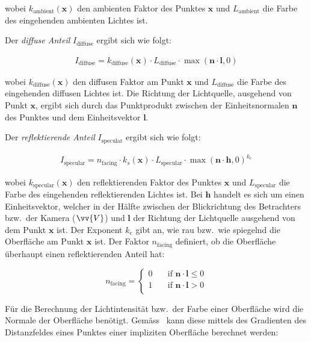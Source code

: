 wobei $k_{\text{ambient}}(\bm{x})$ den ambienten Faktor des
Punktes $\bm{x}$ und $L_{\text{ambient}}$ die Farbe des eingehenden ambienten
Lichtes ist.

Der \textit{diffuse Anteil} $I_{\text{diffuse}}$ ergibt sich wie folgt:

\begin{gather}
    I_{\text{diffuse}} = k_{\text{diffuse}}(\bm{x}) \cdot L_{\text{diffuse}} \cdot \max(\bm{n} \cdot \bm{l}, 0)
\end{gather}

wobei $k_{\text{diffuse}}(\bm{x})$ den diffusen Faktor am Punkt $\bm{x}$
und $L_{\text{diffuse}}$ die Farbe des eingehenden diffusen Lichtes ist.
Die Richtung der Lichtquelle, ausgehend von Punkt $\bm{x}$, ergibt sich
durch das Punktprodukt zwischen der Einheitsnormalen $\bm{n}$ des
Punktes und dem Einheitsvektor $\bm{l}$.

Der \textit{reflektierende Anteil} $I_{\text{specular}}$ ergibt sich
wie folgt:

\begin{gather}
    I_{\text{specular}} = n_{\text{facing}} \cdot k_{s}(\bm{x}) \cdot L_{\text{specular}} \cdot \max{(\bm{n} \cdot \bm{h}, 0)}^{k_{e}}
\end{gather}

wobei $k_{\text{specular}}(\bm{x})$ den reflektierenden Faktor des
Punktes $\bm{x}$ und $L_{\text{specular}}$ die Farbe des eingehenden
reflektierenden Lichtes ist. Bei $\bm{h}$ handelt es sich um einen
Einheitsvektor, welcher in der Hälfte zwischen der Blickrichtung des
Betrachters bzw.\ der Kamera ($\vv{V}$) und $\bm{l}$ der Richtung der
Lichtquelle ausgehend von dem Punkt $\bm{x}$ ist. Der Exponent $k_{e}$
gibt an, wie rau bzw.\ wie spiegelnd die Oberfläche am Punkt $\bm{x}$
ist. Der Faktor $n_{\text{facing}}$ definiert, ob die Oberfläche
überhaupt einen reflektierenden Anteil hat:

\begin{equation}
    n_{\text{facing}} = \begin{cases}
        0 & \quad \text{if } \bm{n} \cdot \bm{l} \leq 0\\
        1 & \quad \text{if } \bm{n} \cdot \bm{l} > 0 \\
    \end{cases}
\end{equation}

Für die Berechnung der Lichtintensität bzw.\ der Farbe einer Oberfläche
wird die Normale der Oberfläche benötigt. Gemäss~\cite{hart_ray_1989}
kann diese mittels des Gradienten des Distanzfeldes
eines Punktes einer impliziten Oberfläche berechnet werden:


